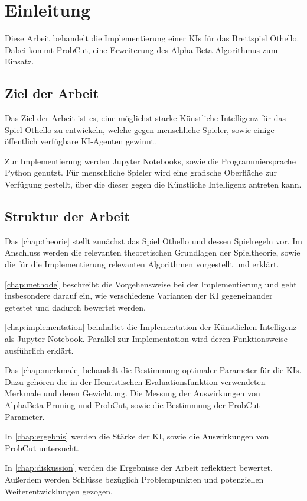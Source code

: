 
\chapter{Einleitung}
\label{chap:einleitung}

Diese Arbeit behandelt die Implementierung einer \acp{KI} für das Brettspiel Othello. Dabei kommt
ProbCut\cite[S.~1]{probcut}, eine Erweiterung des Alpha-Beta Algorithmus zum Einsatz.

\section{Ziel der Arbeit}
Das Ziel der Arbeit ist es, eine möglichst starke Künstliche Intelligenz für das Spiel Othello zu entwickeln, welche
gegen menschliche Spieler, sowie einige öffentlich verfügbare KI-Agenten gewinnt.

Zur Implementierung werden Jupyter Notebooks, sowie die Programmiersprache Python genutzt.
Für menschliche Spieler wird eine grafische Oberfläche zur Verfügung gestellt, über
die dieser gegen die Künstliche Intelligenz antreten kann.

\section{Struktur der Arbeit}
Das \autoref{chap:theorie} stellt zunächst das Spiel Othello und dessen Spielregeln vor. Im Anschluss werden die
relevanten theoretischen Grundlagen der Spieltheorie, sowie die für die Implementierung relevanten Algorithmen
vorgestellt und erklärt.

\autoref{chap:methode} beschreibt die Vorgehensweise bei der Implementierung und geht insbesondere darauf ein, wie
 verschiedene Varianten der KI gegeneinander getestet und dadurch bewertet werden.

\autoref{chap:implementation} beinhaltet die Implementation der Künstlichen Intelligenz als Jupyter Notebook. Parallel
zur Implementation wird deren Funktionsweise ausführlich erklärt.

Das \autoref{chap:merkmale} behandelt die Bestimmung optimaler Parameter für die \acp{KI}. Dazu gehören die in der
Heuristischen-Evaluationsfunktion verwendeten Merkmale und deren Gewichtung. Die Messung der Auswirkungen von
AlphaBeta-Pruning und ProbCut, sowie die Bestimmung der ProbCut Parameter.

In \autoref{chap:ergebnis} werden die Stärke der KI, sowie die Auswirkungen von ProbCut untersucht.

In \autoref{chap:diskussion} werden die Ergebnisse der Arbeit reflektiert bewertet. Außerdem werden Schlüsse bezüglich
Problempunkten und potenziellen Weiterentwicklungen gezogen.